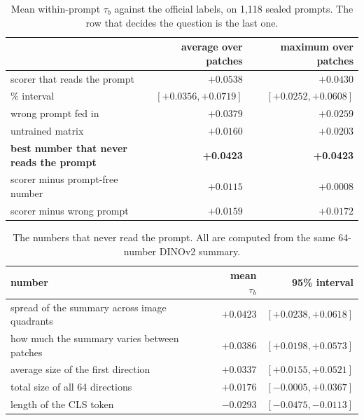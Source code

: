 \documentclass[11pt]{article}
\newcommand{\bad}[1]{\textcolor{red!70!black}{#1}}
\begin{document}
\begin{table}[h]
\centering
\caption{Mean within-prompt $\tau_b$ against the official labels, on 1{,}118 sealed prompts. The row
that decides the question is the last one.}
\begin{tabular}{@{}lrr@{}}
\toprule
 & average over patches & maximum over patches \\
\midrule
scorer that reads the prompt & $+0.0538$ & $+0.0430$ \\
\quad 95\% interval & $[+0.0356,+0.0719]$ & $[+0.0252,+0.0608]$ \\
\midrule
wrong prompt fed in            & $+0.0379$ & $+0.0259$ \\
untrained matrix               & $+0.0160$ & $+0.0203$ \\
\midrule
\textbf{best number that never reads the prompt} & \textbf{+0.0423} & \textbf{+0.0423} \\
\midrule
scorer minus prompt-free number & \bad{$+0.0115$} & \bad{$+0.0008$} \\
scorer minus wrong prompt       & $+0.0159$ & $+0.0172$ \\
\bottomrule
\end{tabular}
\end{table}

\begin{table}[h]
\centering
\caption{The numbers that never read the prompt. All are computed from the same 64-number DINOv2
summary.}
\begin{tabular}{@{}lrr@{}}
\toprule
number & mean $\tau_b$ & 95\% interval \\
\midrule
spread of the summary across image quadrants & $+0.0423$ & $[+0.0238,+0.0618]$ \\
how much the summary varies between patches  & $+0.0386$ & $[+0.0198,+0.0573]$ \\
average size of the first direction          & $+0.0337$ & $[+0.0155,+0.0521]$ \\
total size of all 64 directions              & $+0.0176$ & $[-0.0005,+0.0367]$ \\
length of the CLS token                      & $-0.0293$ & $[-0.0475,-0.0113]$ \\
\bottomrule
\end{tabular}
\end{table}
\end{document}
